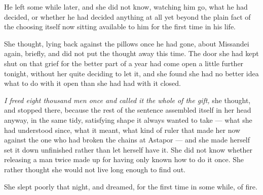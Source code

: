 \sceneBreak

He left some while later, and she did not know, watching him go, what he had decided, or whether he had decided anything at all yet beyond the plain fact of the choosing itself now sitting available to him for the first time in his life.

She thought, lying back against the pillows once he had gone, about Missandei again, briefly, and did not put the thought away this time. The door she had kept shut on that grief for the better part of a year had come open a little further tonight, without her quite deciding to let it, and she found she had no better idea what to do with it open than she had had with it closed.

\textit{I freed eight thousand men once and called it the whole of the gift,} she thought, and stopped there, because the rest of the sentence assembled itself in her head anyway, in the same tidy, satisfying shape it always wanted to take — what she had understood since, what it meant, what kind of ruler that made her now against the one who had broken the chains at Astapor — and she made herself set it down unfinished rather than let herself have it. She did not know whether releasing a man twice made up for having only known how to do it once. She rather thought she would not live long enough to find out.

She slept poorly that night, and dreamed, for the first time in some while, of fire.